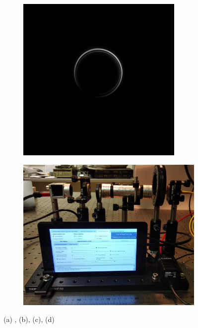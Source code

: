 \documentclass[11pt, a4paper, twoside]{article} %
\begin{document}
\begin{figure}[h!]
\begin{subfigure}[b]{0.32\linewidth}
     \includegraphics[width=\linewidth]{deimos5.png}
     \end{subfigure}
      \begin{subfigure}[b]{0.42\linewidth}
     \includegraphics[width=\linewidth]{demo2.jpg}
     \end{subfigure}
    \caption{(a) , (b), (c), (d)}
        \label{fig:proof}
\end{figure}
\end{document}
